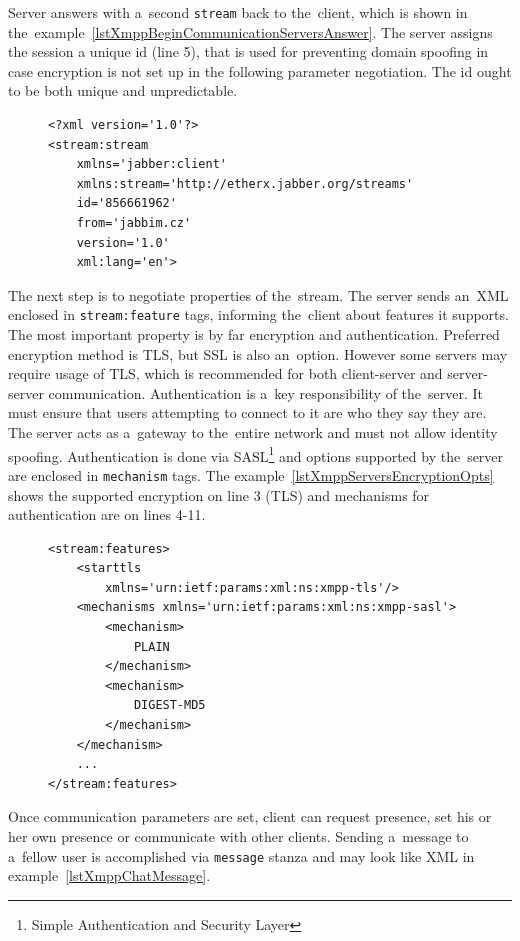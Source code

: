 Server answers with a~second \verb|stream| back to the~client, which is shown in the~example~\ref{lstXmppBeginCommunicationServersAnswer}. The server assigns the session a unique id (line 5), that is used for preventing domain spoofing in case encryption is not set up in the following parameter negotiation. The id ought to be both unique and unpredictable.

\begin{figure}[h]
\begin{lstlisting}
<?xml version='1.0'?>
<stream:stream 
	xmlns='jabber:client' 
	xmlns:stream='http://etherx.jabber.org/streams' 
	id='856661962' 
	from='jabbim.cz' 
	version='1.0' 
	xml:lang='en'>
\end{lstlisting}
\end{figure}

The next step is to negotiate properties of the~stream. The server sends an~XML enclosed in \verb|stream:feature| tags, informing the~client about features it supports. The most important property is by far encryption and authentication. Preferred encryption method is TLS, but SSL is also an~option. However some servers may require usage of TLS, which is recommended for both client-server and server-server communication. Authentication is a~key responsibility of the~server. It must ensure that users attempting to connect to it are who they say they are. The server acts as a~gateway to the~entire network and must not allow identity spoofing. Authentication is done via SASL\footnote{Simple Authentication and Security Layer} and options supported by the~server are enclosed in \verb|mechanism| tags. The example~\ref{lstXmppServersEncryptionOpts} shows the supported encryption on line 3 (TLS) and mechanisms for authentication are on lines 4-11.

\begin{figure}[h]
\begin{lstlisting}
<stream:features>
	<starttls 
		xmlns='urn:ietf:params:xml:ns:xmpp-tls'/>
	<mechanisms xmlns='urn:ietf:params:xml:ns:xmpp-sasl'>
		<mechanism>
			PLAIN
		</mechanism>
		<mechanism>
			DIGEST-MD5
		</mechanism>
	</mechanism>
	...
</stream:features>
\end{lstlisting}
\end{figure}

Once communication parameters are set, client can request presence, set his or her own presence or communicate with other clients. Sending a~message to a~fellow user is accomplished via \verb|message| stanza and may look like XML in example~\ref{lstXmppChatMessage}.

